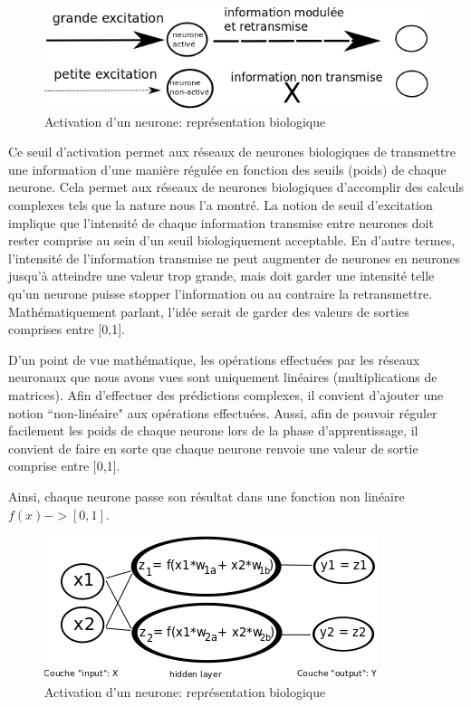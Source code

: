 \documentclass[11pt,a4paper]{report}
\begin{document}
    \begin{figure}[!h]
    \center
    \includegraphics[scale=0.74]{ressources/nn_theory_4.png}
    \caption{Activation d'un neurone: représentation biologique}
    \end{figure} 
    
    \par Ce seuil d'activation permet aux réseaux de neurones biologiques de transmettre une information d'une manière régulée en fonction des seuils (poids) de chaque neurone. Cela permet aux réseaux de neurones biologiques d'accomplir des calculs complexes tels que la nature nous l'a montré. La notion de seuil d'excitation implique que l'intensité de chaque information transmise entre neurones doit rester comprise au sein d'un seuil biologiquement acceptable. En d'autre termes, l'intensité de l'information transmise ne peut augmenter de neurones en neurones jusqu'à atteindre une valeur trop grande, mais doit garder une intensité telle qu'un neurone puisse stopper l'information ou au contraire la retransmettre. Mathématiquement parlant, l'idée serait de garder des valeurs de sorties comprises entre [0,1]. 
    
    \par D'un point de vue mathématique, les opérations effectuées par les réseaux neuronaux que nous avons vues sont uniquement linéaires (multiplications de matrices). Afin d'effectuer des prédictions complexes, il convient d'ajouter une notion ``non-linéaire" aux opérations effectuées. Aussi, afin de pouvoir réguler facilement les poids de chaque neurone lors de la phase d'apprentissage, il convient de faire en sorte que chaque neurone renvoie une valeur de sortie comprise entre [0,1]. 
    
    \par Ainsi, chaque neurone passe son résultat dans une fonction non linéaire $f(x) -> [0,1]$. 
    
    \begin{figure}[!h]
    \center
    \includegraphics[scale=0.74]{ressources/nn_theory_5.png}
    \caption{Activation d'un neurone: représentation biologique}
    \end{figure} 
    
\end{document}
